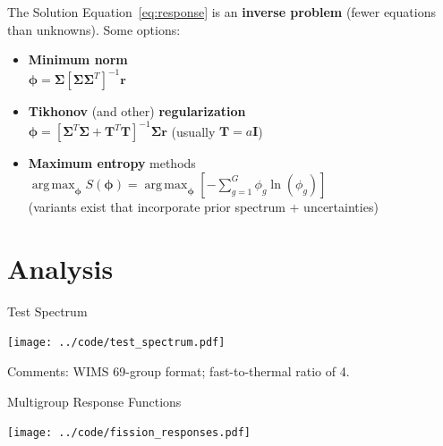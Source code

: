 \documentclass[fleqn]{beamer}
\begin{document}
    
    \begin{frame}{The Solution}
      Equation~\ref{eq:response} is an {\bf inverse problem} (fewer equations than unknowns). 
      \vfill
      Some options: 
      \begin{itemize}
       \item {\bf Minimum norm} \\
             $\bm{\phi} =  \bm{\Sigma}  [\bm{\Sigma} \bm{\Sigma}^T]^{-1}\mathbf{r}$
       \item {\bf Tikhonov} (and other) {\bf regularization} \\
             $\bm{\phi} = [\bm{\Sigma}^T \bm{\Sigma}+ \mathbf{T}^T \mathbf{T}]^{-1} \bm{\Sigma} \mathbf{r}$ (usually $\mathbf{T} = a\mathbf{I}$)
       \item {\bf Maximum entropy} methods
             $\operatorname*{arg\,max}_{\bm{\phi}} S(\bm{\phi}) = 
                \operatorname*{arg\,max}_{\bm{\phi}} \left [ -\sum^G_{g=1} \phi_g \ln(\phi_g) \right ]$ \\
             (variants exist that incorporate prior spectrum + uncertainties)
      \end{itemize}
    \end{frame}
    
    \section{Analysis}
    
    \begin{frame}{Test Spectrum}
         \begin{center}
             \texttt{[image: ../code/test\_spectrum.pdf]}
         \end{center}
         Comments: WIMS 69-group format; fast-to-thermal ratio of 4.
    \end{frame}
    
    \begin{frame}{Multigroup Response Functions}
         \begin{center}
             \texttt{[image: ../code/fission\_responses.pdf]}
         \end{center}
    \end{frame}
\end{document}
